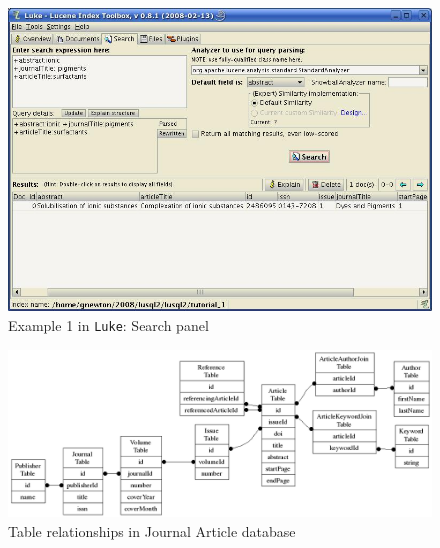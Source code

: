 \begin{figure}
  \begin{center}
    \includegraphics[width=\textwidth]{images/luke_1_3.png}
  \end{center}
  \caption{Example 1 in {\tt Luke}: Search panel}
  \label{luke_1_3}
\end{figure}


\begin{landscape}
\begin{figure}
  \begin{center}
    \includegraphics[width=19cm]{dot/tables.png}
  \end{center}
  \caption{Table relationships in Journal Article database}
  \label{tables}
\end{figure}
\end{landscape}



